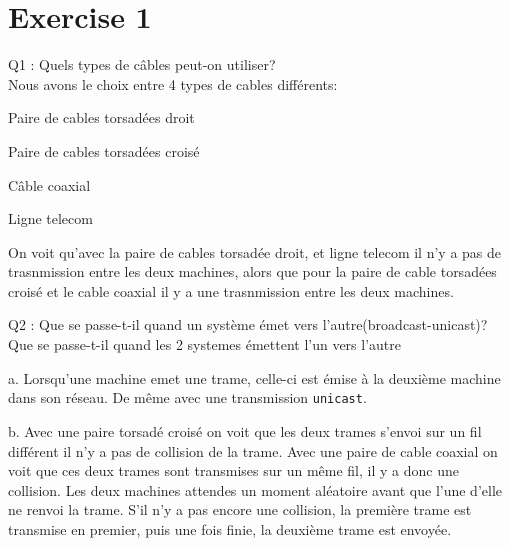 \documentclass[11pt]{book}
\begin{document}
    \tableofcontents


    \newpage

    \section{Exercise 1}

        \begin{dent}{Q1 :} Quels types de câbles peut-on utiliser?\\
            Nous avons le choix entre 4 types de cables différents: 
            \begin{items}{-15pt}{-15pt}
                \item Paire de cables torsadées droit 
                \item Paire de cables torsadées croisé
                \item Câble coaxial
                \item Ligne telecom
            \end{items}
            On voit qu'avec la paire de cables torsadée droit, et ligne telecom il n'y a pas de trasnmission entre les deux machines, alors que pour la paire de cable torsadées croisé et le cable coaxial il y a une trasnmission entre les deux machines.
         \end{dent}

        \begin{dent}{Q2 :} Que se passe-t-il quand un système émet vers l'autre(broadcast-unicast)? Que se passe-t-il quand les 2 systemes émettent l'un vers l'autre\\
            \begin{enum}{-15pt}{-15pt}
                \item[a.] Lorsqu'une machine emet une trame, celle-ci est émise à la deuxième machine dans son réseau. De même avec une transmission \texttt{unicast}.
                \item[b.] Avec une paire torsadé croisé on voit que les deux trames s'envoi sur un fil différent il n'y a pas de collision de la trame. Avec une paire de cable coaxial on voit que ces deux trames sont transmises sur un même fil, il y a donc une collision. Les deux machines attendes un moment aléatoire avant que l'une d'elle ne renvoi la trame. S'il n'y a pas encore une collision, la première trame est transmise en premier, puis une fois finie, la deuxième trame est envoyée. 
            \end{enum}
         \end{dent}
\end{document}

